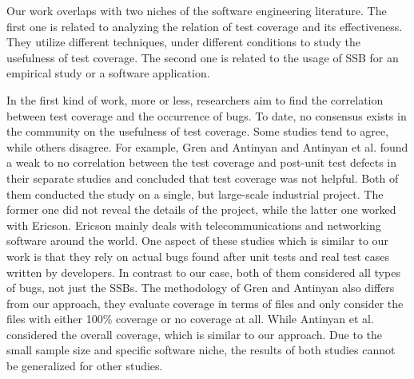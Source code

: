 \documentclass[sigconf,nonacm]{acmart}
\begin{document}
Our work overlaps with two niches of the software engineering literature. The first one is related to analyzing the relation of test coverage and its effectiveness. They utilize different techniques, under different conditions to study the usefulness of test coverage. The second one is related to the usage of SSB for an empirical study or a software application.

In the first kind of work, more or less, researchers aim to find the correlation between test coverage and the occurrence of bugs. To date, no consensus exists in the community on the usefulness of test coverage. Some studies tend to agree, while others disagree. For example, Gren and Antinyan \cite{gren_2017} and Antinyan et al.  \cite{ericson} found a weak to no correlation between the test coverage and post-unit test defects in their separate studies and concluded that test coverage was not helpful. Both of them conducted the study on a single, but large-scale industrial project. The former one did not reveal the details of the project, while the latter one worked with Ericson. Ericson mainly deals with telecommunications and networking software around the world. One aspect of these studies which is similar to our work is that they rely on actual bugs found after unit tests and real test cases written by developers. In contrast to our case, both of them considered all types of bugs, not just the SSBs. The methodology of Gren and Antinyan \cite{gren_2017} also differs from our approach, they evaluate coverage in terms of files and only consider the files with either 100\% coverage or no coverage at all. While Antinyan et al. \cite{ericson} considered the overall coverage, which is similar to our approach. Due to the small sample size and specific software niche, the results of both studies cannot be generalized for other studies.
\end{document}
